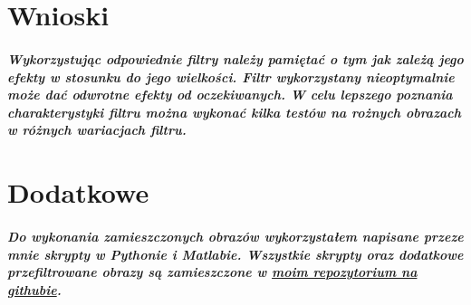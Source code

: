 \documentclass[a4paper,12pt,openany]{report}
\begin{document}
\chapter{Wnioski}

\paragraph{\indent Wykorzystując odpowiednie filtry należy pamiętać o tym jak zależą jego efekty w stosunku do jego wielkości. Filtr wykorzystany nieoptymalnie może dać odwrotne efekty od oczekiwanych. W celu lepszego poznania charakterystyki filtru można wykonać kilka testów na rożnych obrazach w różnych wariacjach filtru.}


\chapter{Dodatkowe}
\paragraph{Do wykonania zamieszczonych obrazów wykorzystałem napisane przeze mnie skrypty w Pythonie i Matlabie. Wszystkie skrypty oraz dodatkowe przefiltrowane obrazy są zamieszczone w \href{https://github.com/FilipM13/CPS}{moim repozytorium na githubie}.}
\end{document}
